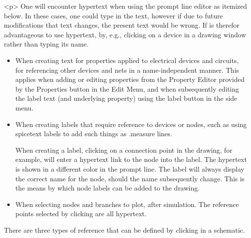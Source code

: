 <p>
One will encounter hypertext when using the prompt line editor as
itemized below.  In these cases, one could type in the text, however
if due to future modifications that text changes, the present text
would be wrong.  If is therefor advantageous to use hypertext, by,
e.g., clicking on a device in a drawing window rather than typing its
name.

\begin{itemize}
\item{When creating text for properties applied to electrical devices
and circuits, for referencing other devices and nets in a
name-independent manner.  This applies when adding or editing
properties from the {\cb Property Editor} provided by the {\cb
Properties} button in the {\cb Edit Menu}, and when subsequently
editing the label text (and underlying property) using the {\cb label}
button in the side menu.}

\item{When creating labels that require reference to devices or nodes,
such as using spicetext labels to add such things as {\vt .measure}
lines.

When creating a label, clicking on a connection point in the drawing,
for example, will enter a hypertext link to the node into the label. 
The hypertext is shown in a different color in the prompt line.  The
label will always display the correct name for the node, should the
name subsequently change.  This is the means by which node labels can
be added to the drawing.}

\item{When selecting nodes and branches to plot, after simulation. 
The reference points selected by clicking are all hypertext.}
\end{itemize}

There are three types of reference that can be defined by clicking
in a schematic.

